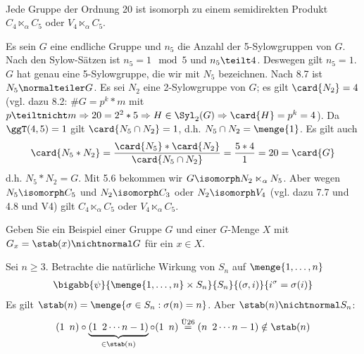 \begin{uebungsblatt}
\begin{loesung}
\begin{itemize}
\begin{align*}
	\end{align*}
	\end{itemize}
\end{loesung}
%
\begin{uebung}
	Jede Gruppe der Ordnung 20 ist isomorph zu einem semidirekten Produkt $C_4 \ltimes_{\alpha} C_5$ oder $V_4 \ltimes_{\alpha} C_5$.
\end{uebung}
\begin{loesung}
	Es sein $G$ eine endliche Gruppe und $n_5$ die Anzahl der 5-Sylowgruppen von $G$. Nach den Sylow-Sätzen ist $n_5 = 1 \mod 5$ und $n_5 \teilt 4$. Deswegen gilt $n_5 = 1$. $G$ hat genau eine 5-Sylowgruppe, die wir mit $N_5$ bezeichnen. Nach 8.7 ist $N_5 \normalteiler G$. Es sei $N_2$ eine 2-Sylowgruppe von $G$; es gilt $\card{N_2} = 4$ (vgl. dazu 8.2: $\# G = p^k * m$ mit $p \teiltnicht m \Rightarrow 20 = 2^2*5 \Rightarrow H \in \Syl_2(G) \Rightarrow \card{H} = p^k = 4$). Da $\ggT(4,5)=1$ gilt $\card{N_5 \cap N_2} = 1$, d.h. $N_5 \cap N_2 = \menge{1}$. Es gilt auch
	\begin{align*}
		\card{N_5 * N_2} = \frac{\card{N_5}*\card{N_2}}{\card{N_5 \cap N_2}} = \frac{5*4}{1} = 20 = \card{G}
	\end{align*}
	d.h. $N_5 * N_2 = G$. Mit 5.6 bekommen wir $G \isomorph N_2 \ltimes_{\alpha} N_5$. Aber wegen $N_5 \isomorph C_5$ und $N_2 \isomorph C_3$ oder $N_2 \isomorph V_4$ (vgl. dazu 7.7 und 4.8 und V4) gilt $C_4 \ltimes_{\alpha} C_5$ oder $V_4 \ltimes_{\alpha} C_5$.
\end{loesung}
%
\setcounter{taskcount}{62}
%
\begin{uebung}[Präsenz]
	Geben Sie ein Beispiel einer Gruppe $G$ und einer $G$-Menge $X$ mit $G_x = \stab(x) \nichtnormal G$ für ein $x \in X$.
\end{uebung}
\begin{loesung}
	Sei $n \geq 3$. Betrachte die natürliche Wirkung von $S_n$ auf $\menge{1, \dots , n}$
	\begin{align*}
		\bigabb{\psi}{\menge{1, \dots , n} \times S_n}{S_n}{(\sigma, i)}{i^{\sigma} = \sigma(i)}
	\end{align*}
	Es gilt $\stab(n) = \menge{\sigma \in S_n : \sigma(n) = n}$. Aber $\stab(n) \nichtnormal S_n$:
	\begin{align*}
		(1 \enspace n) \circ \underbrace{(1 \enspace 2 \cdots n-1)}_{\in \stab(n)} \circ (1 \enspace n) \overset{\text{Ü26}}{=} (n \enspace 2 \cdots n-1) \notin \stab(n)
	\end{align*}
\end{loesung}

\end{uebungsblatt}
